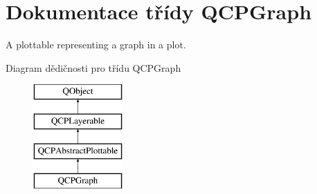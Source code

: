 \hypertarget{classQCPGraph}{}\section{Dokumentace třídy Q\+C\+P\+Graph}
\label{classQCPGraph}


A plottable representing a graph in a plot.  


Diagram dědičnosti pro třídu Q\+C\+P\+Graph\begin{figure}[H]
\begin{center}
\leavevmode
\includegraphics[height=4.000000cm]{classQCPGraph}
\end{center}
\end{figure}
